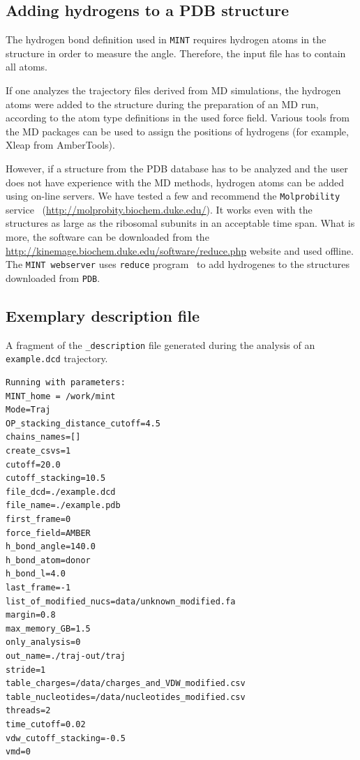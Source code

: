 \documentclass[12pt]{article}
\begin{document}
\begin{appendices}
\subsection{Adding hydrogens to a PDB structure}
The hydrogen bond definition used in {\tt MINT} requires hydrogen atoms in the structure in order to measure the angle. Therefore, the input file has to contain all atoms.

If one analyzes the trajectory files derived from MD simulations, the hydrogen atoms were added to the structure during the preparation of an MD run, according to the atom type definitions in the used force field. Various tools from the MD packages can be used to assign the positions of hydrogens (for example, Xleap from AmberTools). 

However, if a structure from the PDB database has to be analyzed and the user does not have experience with the MD methods, hydrogen atoms can be added using on-line servers. We have tested a few and recommend the {\tt Molprobility} service~\cite{Chen2010} (\url{http://molprobity.biochem.duke.edu/}). It works even with the structures as large as the ribosomal subunits in an acceptable time span. What is more, the software can be downloaded from the \url{http://kinemage.biochem.duke.edu/software/reduce.php} website and used offline. The {\tt MINT webserver} uses {\tt reduce} program~\cite{Word1999a} to add hydrogenes to the structures downloaded from {\tt PDB}. 

\subsection{Exemplary description file}
A fragment of the {\tt \_description} file generated during the analysis of an {\tt example.dcd} trajectory.
\begin{scriptsize}
\begin{lstlisting}
Running with parameters: 
MINT_home = /work/mint
Mode=Traj
OP_stacking_distance_cutoff=4.5
chains_names=[]
create_csvs=1
cutoff=20.0
cutoff_stacking=10.5
file_dcd=./example.dcd
file_name=./example.pdb
first_frame=0
force_field=AMBER
h_bond_angle=140.0
h_bond_atom=donor
h_bond_l=4.0
last_frame=-1
list_of_modified_nucs=data/unknown_modified.fa
margin=0.8
max_memory_GB=1.5
only_analysis=0
out_name=./traj-out/traj
stride=1
table_charges=/data/charges_and_VDW_modified.csv
table_nucleotides=/data/nucleotides_modified.csv
threads=2
time_cutoff=0.02
vdw_cutoff_stacking=-0.5
vmd=0


\end{lstlisting}
\end{scriptsize}
\end{appendices}
\end{document}
